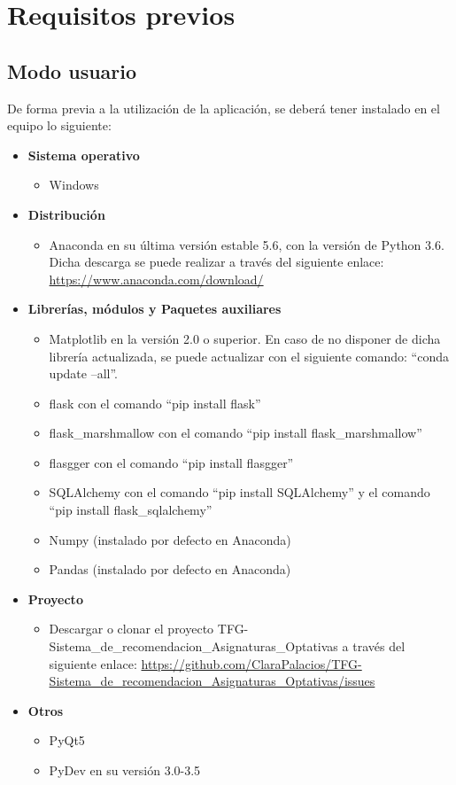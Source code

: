 
\section{Requisitos previos}
\subsection{Modo usuario}
De forma previa a la utilización de la aplicación, se deberá tener instalado en el equipo lo siguiente: 
\begin{itemize}
\item \textbf{Sistema operativo}
\begin{itemize}
\item Windows
\end{itemize} 
\item \textbf{Distribución}
\begin{itemize}
\item Anaconda en su última versión estable 5.6, con la versión de Python 3.6. Dicha descarga se puede realizar a través del siguiente enlace: \url{https://www.anaconda.com/download/}
\end{itemize}
\item \textbf{Librerías, módulos  y Paquetes auxiliares}
\begin{itemize}
\item Matplotlib en la versión 2.0 o superior. En caso de no disponer de dicha librería actualizada, se puede actualizar con el siguiente comando: ``conda update --all''.
\item flask con el comando ``pip install flask''
\item flask\_marshmallow con el comando ``pip install flask\_marshmallow''
\item flasgger con el comando ``pip install flasgger''
\item SQLAlchemy con el comando ``pip install SQLAlchemy'' y el comando ``pip install flask\_sqlalchemy''
\item Numpy (instalado por defecto en Anaconda)
\item Pandas (instalado por defecto en Anaconda)
\end{itemize}
\item \textbf{Proyecto}
\begin{itemize}
\item Descargar o clonar el proyecto TFG-Sistema\_de\_recomendacion\_Asignaturas\_Optativas a través del siguiente enlace: \url{https://github.com/ClaraPalacios/TFG-Sistema_de_recomendacion_Asignaturas_Optativas/issues}
\end{itemize}
\item \textbf{Otros}
\begin{itemize}
\item PyQt5
\item PyDev en su versión 3.0-3.5
\end{itemize}
\end{itemize}

